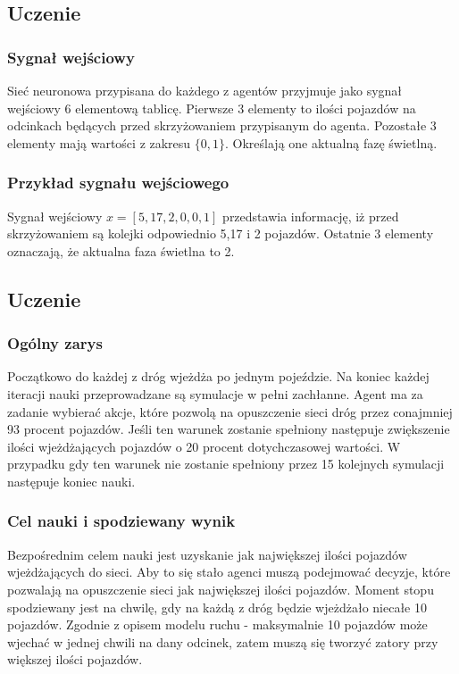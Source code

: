 \documentclass[12pt]{book}
\theoremstyle{plain}
\begin{document}
\subsection{Uczenie}
\subsubsection*{Sygnał wejściowy}
Sieć neuronowa przypisana do każdego z agentów przyjmuje jako sygnał wejściowy 6 elementową tablicę. Pierwsze 3 elementy to ilości pojazdów na odcinkach będących przed skrzyżowaniem przypisanym do agenta. Pozostałe 3 elementy mają wartości z zakresu $\{0,1\}$. Określają one aktualną fazę świetlną. 
\subsubsection*{Przykład sygnału wejściowego}
Sygnał wejściowy $x=[5,17,2,0,0,1]$ przedstawia informację, iż przed skrzyżowaniem są kolejki odpowiednio 5,17 i 2 pojazdów. Ostatnie 3 elementy oznaczają, że aktualna faza świetlna to 2.

\subsection*{Uczenie}
\subsubsection{Ogólny zarys}
Początkowo do każdej z dróg wjeżdża po jednym pojeździe. Na koniec każdej iteracji nauki przeprowadzane są symulacje w pełni zachłanne. Agent ma za zadanie wybierać akcje, które pozwolą na opuszczenie sieci dróg przez conajmniej 93 procent pojazdów. Jeśli ten warunek zostanie spełniony następuje zwiększenie ilości wjeżdżających pojazdów o 20 procent dotychczasowej wartości. W przypadku gdy ten warunek nie zostanie spełniony przez 15 kolejnych symulacji następuje koniec nauki. 
\subsubsection*{Cel nauki i spodziewany wynik}
Bezpośrednim celem nauki jest uzyskanie jak największej ilości pojazdów wjeżdżających do sieci. Aby to się stało agenci muszą podejmować decyzje, które pozwalają na opuszczenie sieci jak największej ilości pojazdów. Moment stopu spodziewany jest na chwilę, gdy na każdą z dróg będzie wjeżdżało niecałe 10 pojazdów. Zgodnie z opisem modelu ruchu - maksymalnie 10 pojazdów może wjechać w jednej chwili na dany odcinek, zatem muszą się tworzyć zatory przy większej ilości pojazdów.
\end{document}
